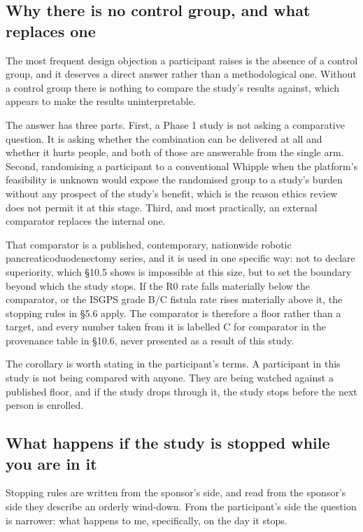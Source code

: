 \subsection{Why there is no control group, and what replaces one}

The most frequent design objection a participant raises is the absence of a
control group, and it deserves a direct answer rather than a methodological
one. Without a control group there is nothing to compare the study's results
against, which appears to make the results uninterpretable.

The answer has three parts. First, a Phase 1 study is not asking a comparative
question. It is asking whether the combination can be delivered at all and
whether it hurts people, and both of those are answerable from the single arm.
Second, randomising a participant to a conventional Whipple when the platform's
feasibility is unknown would expose the randomised group to a study's burden
without any prospect of the study's benefit, which is the reason ethics review
does not permit it at this stage. Third, and most practically, an external
comparator replaces the internal one.

That comparator is a published, contemporary, nationwide robotic
pancreaticoduodenectomy series, and it is used in one specific way: not to
declare superiority, which \S 10.5 shows is impossible at this size, but to set
the boundary beyond which the study stops. If the R0 rate falls materially below
the comparator, or the ISGPS grade B/C fistula rate rises materially above it,
the stopping rules in \S 5.6 apply. The comparator is therefore a floor rather
than a target, and every number taken from it is labelled C for comparator in
the provenance table in \S 10.6, never presented as a result of this study.

The corollary is worth stating in the participant's terms. A participant in this
study is not being compared with anyone. They are being watched against a
published floor, and if the study drops through it, the study stops before the
next person is enrolled.

\subsection{What happens if the study is stopped while you are in it}

Stopping rules are written from the sponsor's side, and read from the sponsor's
side they describe an orderly wind-down. From the participant's side the
question is narrower: what happens to me, specifically, on the day it stops.

